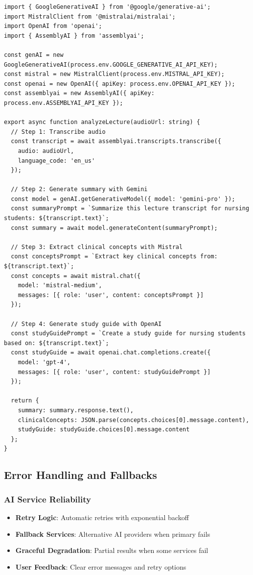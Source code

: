 \documentclass[12pt,a4paper]{article}
\begin{document}
\begin{lstlisting}[caption=AI Analysis Implementation]
import { GoogleGenerativeAI } from '@google/generative-ai';
import MistralClient from '@mistralai/mistralai';
import OpenAI from 'openai';
import { AssemblyAI } from 'assemblyai';

const genAI = new GoogleGenerativeAI(process.env.GOOGLE_GENERATIVE_AI_API_KEY);
const mistral = new MistralClient(process.env.MISTRAL_API_KEY);
const openai = new OpenAI({ apiKey: process.env.OPENAI_API_KEY });
const assemblyai = new AssemblyAI({ apiKey: process.env.ASSEMBLYAI_API_KEY });

export async function analyzeLecture(audioUrl: string) {
  // Step 1: Transcribe audio
  const transcript = await assemblyai.transcripts.transcribe({
    audio: audioUrl,
    language_code: 'en_us'
  });

  // Step 2: Generate summary with Gemini
  const model = genAI.getGenerativeModel({ model: 'gemini-pro' });
  const summaryPrompt = `Summarize this lecture transcript for nursing students: ${transcript.text}`;
  const summary = await model.generateContent(summaryPrompt);

  // Step 3: Extract clinical concepts with Mistral
  const conceptsPrompt = `Extract key clinical concepts from: ${transcript.text}`;
  const concepts = await mistral.chat({
    model: 'mistral-medium',
    messages: [{ role: 'user', content: conceptsPrompt }]
  });

  // Step 4: Generate study guide with OpenAI
  const studyGuidePrompt = `Create a study guide for nursing students based on: ${transcript.text}`;
  const studyGuide = await openai.chat.completions.create({
    model: 'gpt-4',
    messages: [{ role: 'user', content: studyGuidePrompt }]
  });

  return {
    summary: summary.response.text(),
    clinicalConcepts: JSON.parse(concepts.choices[0].message.content),
    studyGuide: studyGuide.choices[0].message.content
  };
}
\end{lstlisting}

\subsection{Error Handling and Fallbacks}

\subsubsection{AI Service Reliability}
\begin{itemize}
    \item \textbf{Retry Logic}: Automatic retries with exponential backoff
    \item \textbf{Fallback Services}: Alternative AI providers when primary fails
    \item \textbf{Graceful Degradation}: Partial results when some services fail
    \item \textbf{User Feedback}: Clear error messages and retry options
\end{itemize}
\end{document}
